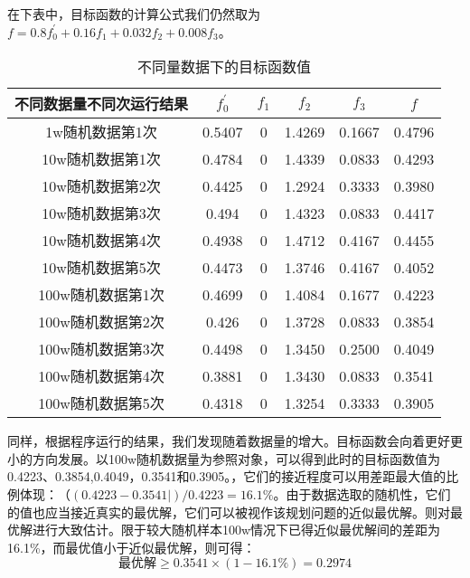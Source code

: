 \documentclass{article}
\begin{document}
	在下表中，目标函数的计算公式我们仍然取为$f=0.8f_0^{'}+0.16f_1+0.032f_2+0.008f_3$。
	\newpage
	\begin{table}[!h]
		\centering
		\caption{不同量数据下的目标函数值}
		\begin{tabular}{|c|c|c|c|c|c|}
			\hline
			不同数据量不同次运行结果 & $f_0^{'}$  & $f_1$ & $f_2$  & $f_3$  & $f$    \\
			\hline
			1w随机数据第1次    & 0.5407 & 0     & 1.4269 & 0.1667 & 0.4796 \\
			10w随机数据第1次   & 0.4784 & 0     & 1.4339 & 0.0833 & 0.4293 \\
			10w随机数据第2次   & 0.4425 & 0     & 1.2924 & 0.3333 & 0.3980 \\
			10w随机数据第3次   & 0.494  & 0     & 1.4323 & 0.0833 & 0.4417 \\
			10w随机数据第4次   & 0.4938 & 0     & 1.4712 & 0.4167 & 0.4455 \\
			10w随机数据第5次   & 0.4473 & 0     & 1.3746 & 0.4167 & 0.4052 \\
			100w随机数据第1次  & 0.4699 & 0     & 1.4084 & 0.1677 & 0.4223 \\
			100w随机数据第2次  & 0.426  & 0     & 1.3728 & 0.0833 & 0.3854 \\
			100w随机数据第3次  & 0.4498 & 0     & 1.3450 & 0.2500 & 0.4049 \\
			100w随机数据第4次  & 0.3881 & 0     & 1.3430 & 0.0833 & 0.3541 \\
			100w随机数据第5次  & 0.4318 & 0     & 1.3254 & 0.3333 & 0.3905\\
			\hline
		\end{tabular}
	\end{table}
	
	同样，根据程序运行的结果，我们发现随着数据量的增大。目标函数会向着更好更小的方向发展。以100w随机数据量为参照对象，可以得到此时的目标函数值为0.4223、0.3854,0.4049，0.3541和0.3905。，它们的接近程度可以用差距最大值的比例体现：$（(0.4223-0.3541|)/0.4223=16.1\%$。由于数据选取的随机性，它们的值也应当接近真实的最优解，它们可以被视作该规划问题的近似最优解。则对最优解进行大致估计。限于较大随机样本100w情况下已得近似最优解间的差距为16.1\%，而最优值小于近似最优解，则可得：
	\begin{equation}
		\text{最优解}\geq 0.3541\times(1-16.1\%)=0.2974
	\end{equation}
\end{document}
